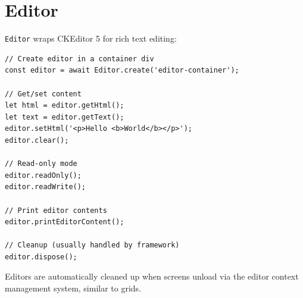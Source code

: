 \section{Editor}
\label{sec:feu-editor}

\texttt{Editor} wraps CKEditor 5 for rich text editing:

\begin{lstlisting}[style=javascript]
// Create editor in a container div
const editor = await Editor.create('editor-container');

// Get/set content
let html = editor.getHtml();
let text = editor.getText();
editor.setHtml('<p>Hello <b>World</b></p>');
editor.clear();

// Read-only mode
editor.readOnly();
editor.readWrite();

// Print editor contents
editor.printEditorContent();

// Cleanup (usually handled by framework)
editor.dispose();
\end{lstlisting}

\noindent
Editors are automatically cleaned up when screens unload via the editor context management system, similar to grids.
